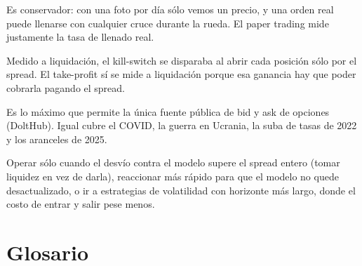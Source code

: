 \documentclass[11pt,a4paper]{article}
\begin{document}
{Es conservador: con una foto por día sólo vemos un precio, y una orden real puede llenarse con cualquier cruce
durante la rueda. El paper trading mide justamente la tasa de llenado real.}

{Medido a liquidación, el kill-switch se disparaba al abrir cada posición sólo por el spread. El take-profit sí se
mide a liquidación porque esa ganancia hay que poder cobrarla pagando el spread.}

{Es lo máximo que permite la única fuente pública de bid y ask de opciones (DoltHub). Igual cubre el COVID, la guerra
en Ucrania, la suba de tasas de 2022 y los aranceles de 2025.}

{Operar sólo cuando el desvío contra el modelo supere el spread entero (tomar liquidez en vez de darla), reaccionar
más rápido para que el modelo no quede desactualizado, o ir a estrategias de volatilidad con horizonte más largo,
donde el costo de entrar y salir pese menos.}

\newpage
\section{Glosario}
\end{document}
